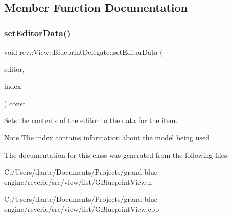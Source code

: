 \subsection{Member Function Documentation}
\mbox{\label{classrev_1_1_view_1_1_blueprint_delegate_a2b9b9f5e05003be17cd3aa34202b20cf}} 
\subsubsection{\texorpdfstring{setEditorData()}{setEditorData()}}
{\footnotesize\ttfamily void rev\+::\+View\+::\+Blueprint\+Delegate\+::set\+Editor\+Data (\begin{DoxyParamCaption}\item[{Q\+Widget $\ast$}]{editor,  }\item[{const Q\+Model\+Index \&}]{index }\end{DoxyParamCaption}) const\hspace{0.3cm}{\ttfamily [override]}}



Sets the contents of the editor to the data for the item. 

\begin{DoxyNote}{Note}
The index contains information about the model being used 
\end{DoxyNote}


The documentation for this class was generated from the following files\+:\begin{DoxyCompactItemize}
\item 
C\+:/\+Users/dante/\+Documents/\+Projects/grand-\/blue-\/engine/reverie/src/view/list/G\+Blueprint\+View.\+h\item 
C\+:/\+Users/dante/\+Documents/\+Projects/grand-\/blue-\/engine/reverie/src/view/list/G\+Blueprint\+View.\+cpp\end{DoxyCompactItemize}

